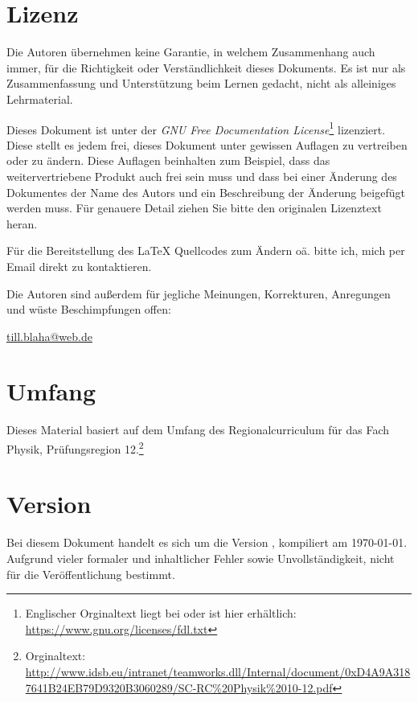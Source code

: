 \section*{Lizenz}

Die Autoren übernehmen keine Garantie, in welchem Zusammenhang auch immer, für die Richtigkeit oder Verständlichkeit dieses Dokuments. Es ist nur als Zusammenfassung und Unterstützung beim Lernen gedacht, nicht als alleiniges Lehrmaterial.

Dieses Dokument ist unter der \emph{GNU Free Documentation License}\footnote{Englischer Orginaltext liegt bei oder ist hier erhältlich: \url{https://www.gnu.org/licenses/fdl.txt}} lizenziert. Diese stellt es jedem frei, dieses Dokument unter gewissen Auflagen zu vertreiben oder zu ändern. Diese Auflagen beinhalten zum Beispiel, dass das weitervertriebene Produkt auch frei sein muss und dass bei einer Änderung des Dokumentes der Name des Autors und ein Beschreibung der Änderung beigefügt werden muss. Für genauere Detail ziehen Sie bitte den originalen Lizenztext heran.

Für die Bereitstellung des \LaTeX{} Quellcodes zum Ändern oä. bitte ich, mich per Email direkt zu kontaktieren.

Die Autoren sind außerdem für jegliche Meinungen, Korrekturen, Anregungen und wüste Beschimpfungen offen:

\href{mailto:till.blaha@web.de}{till.blaha@web.de}


\section*{Umfang}

Dieses Material basiert auf dem Umfang des \glqq Regionalcurriculum für das Fach Physik\grqq , Prüfungsregion 12.\footnote{Orginaltext: \url{http://www.idsb.eu/intranet/teamworks.dll/Internal/document/0xD4A9A3187641B24EB79D9320B3060289/SC-RC\%20Physik\%2010-12.pdf}}


\section*{Version}

Bei diesem Dokument handelt es sich um die Version \version , kompiliert am \today . Aufgrund vieler formaler und inhaltlicher Fehler sowie Unvollständigkeit, nicht für die Veröffentlichung bestimmt.